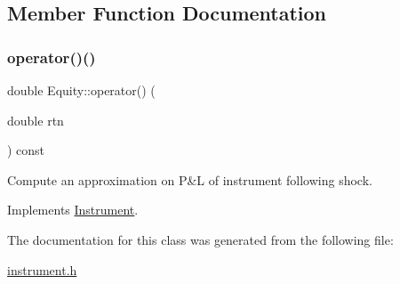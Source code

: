 \subsection{Member Function Documentation}
\hypertarget{classEquity_a2844b7fa3dd164ce216909d1fe958c9f}{}\label{classEquity_a2844b7fa3dd164ce216909d1fe958c9f} 
\subsubsection{\texorpdfstring{operator()()}{operator()()}}
{\footnotesize\ttfamily double Equity\+::operator() (\begin{DoxyParamCaption}\item[{double}]{rtn }\end{DoxyParamCaption}) const\hspace{0.3cm}{\ttfamily [virtual]}}



Compute an approximation on P\&L of instrument following shock. 



Implements \hyperlink{classInstrument_a33b6faccaeb494858dee5c547de897b6}{Instrument}.



The documentation for this class was generated from the following file\+:\begin{DoxyCompactItemize}
\item 
\hyperlink{instrument_8h}{instrument.\+h}\end{DoxyCompactItemize}
